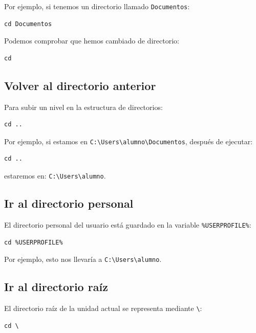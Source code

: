 \documentclass[11pt,a4paper]{article}
\begin{document}
\noindent Por ejemplo, si tenemos un directorio llamado
\texttt{Documentos}:

\begin{lstlisting}
cd Documentos
\end{lstlisting}

\noindent Podemos comprobar que hemos cambiado de directorio:

\begin{lstlisting}
cd
\end{lstlisting}

\subsection{Volver al directorio anterior}

Para subir un nivel en la estructura de directorios:

\begin{lstlisting}
cd ..
\end{lstlisting}

\noindent Por ejemplo, si estamos en \verb|C:\Users\alumno\Documentos|, después de ejecutar:

\begin{lstlisting}
cd ..
\end{lstlisting}

\noindent estaremos en: \verb|C:\Users\alumno|.


\subsection{Ir al directorio personal}

El directorio personal del usuario está guardado en la variable
\texttt{\%USERPROFILE\%}:

\begin{lstlisting}
cd %USERPROFILE%
\end{lstlisting}

\noindent Por ejemplo, esto nos llevaría a
\texttt{C:\textbackslash Users\textbackslash alumno}.

\subsection{Ir al directorio raíz}

El directorio raíz de la unidad actual se representa mediante
\texttt{\textbackslash}:

\begin{lstlisting}
cd \
\end{lstlisting}
\end{document}

